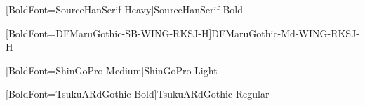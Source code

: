 \newfontfamily{}
[BoldFont={SourceHanSerif-Heavy}]{SourceHanSerif-Bold}
\newcommand{\minchob}{\minchobe\CJKfamily{minchob}}

\newfontfamily{}
[BoldFont={DFMaruGothic-SB-WING-RKSJ-H}]{DFMaruGothic-Md-WING-RKSJ-H}
\newcommand{\maru}{\marue\CJKfamily{maru}}

\newfontfamily{}
[BoldFont={ShinGoPro-Medium}]{ShinGoPro-Light}
\newcommand{\shingo}{\shingoe\CJKfamily{shingo}}

\newfontfamily{}
\newcommand{\outai}{\outaie\CJKfamily{outai}}

\newfontfamily{}
[BoldFont={TsukuARdGothic-Bold}]{TsukuARdGothic-Regular}
\newcommand{\tsuku}{\tsukue\CJKfamily{tsuku}}

\newcommand{\Chapter}[1]{\chapter*{#1\markboth{#1}{}}\addcontentsline{toc}{chapter}{#1}}
\renewcommand{\B}[1]{{\bfseries{#1}}}
